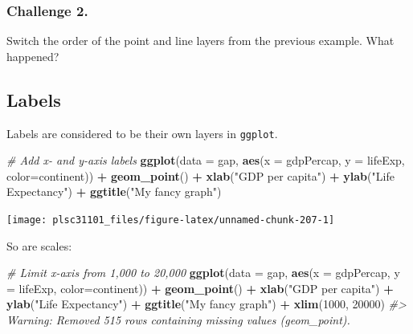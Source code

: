 \documentclass[
]{book}
\newenvironment{Shaded}{\begin{snugshade}}{\end{snugshade}}
\newcommand{\CommentTok}[1]{\textcolor[rgb]{0.56,0.35,0.01}{\textit{#1}}}
\newcommand{\DataTypeTok}[1]{\textcolor[rgb]{0.13,0.29,0.53}{#1}}
\newcommand{\DecValTok}[1]{\textcolor[rgb]{0.00,0.00,0.81}{#1}}
\newcommand{\KeywordTok}[1]{\textcolor[rgb]{0.13,0.29,0.53}{\textbf{#1}}}
\newcommand{\NormalTok}[1]{#1}
\newcommand{\OperatorTok}[1]{\textcolor[rgb]{0.81,0.36,0.00}{\textbf{#1}}}
\newcommand{\StringTok}[1]{\textcolor[rgb]{0.31,0.60,0.02}{#1}}
\begin{document}
\hypertarget{challenge-2.-5}{%
\subsubsection*{Challenge 2.}\label{challenge-2.-5}}

Switch the order of the point and line layers from the previous example. What happened?

\hypertarget{labels-1}{%
\subsection{Labels}\label{labels-1}}

Labels are considered to be their own layers in \texttt{ggplot}.

\begin{Shaded}
\begin{Highlighting}[]
\CommentTok{# Add x- and y-axis labels}
\KeywordTok{ggplot}\NormalTok{(}\DataTypeTok{data =}\NormalTok{ gap, }\KeywordTok{aes}\NormalTok{(}\DataTypeTok{x =}\NormalTok{ gdpPercap, }\DataTypeTok{y =}\NormalTok{ lifeExp, }\DataTypeTok{color=}\NormalTok{continent)) }\OperatorTok{+}\StringTok{ }
\StringTok{  }\KeywordTok{geom_point}\NormalTok{() }\OperatorTok{+}\StringTok{ }
\StringTok{  }\KeywordTok{xlab}\NormalTok{(}\StringTok{"GDP per capita"}\NormalTok{) }\OperatorTok{+}\StringTok{ }
\StringTok{  }\KeywordTok{ylab}\NormalTok{(}\StringTok{"Life Expectancy"}\NormalTok{) }\OperatorTok{+}\StringTok{ }
\StringTok{  }\KeywordTok{ggtitle}\NormalTok{(}\StringTok{"My fancy graph"}\NormalTok{)}
\end{Highlighting}
\end{Shaded}

\begin{center}\texttt{[image: plsc31101\_files/figure-latex/unnamed-chunk-207-1]} \end{center}

So are scales:

\begin{Shaded}
\begin{Highlighting}[]
\CommentTok{# Limit x-axis from 1,000 to 20,000}
\KeywordTok{ggplot}\NormalTok{(}\DataTypeTok{data =}\NormalTok{ gap, }\KeywordTok{aes}\NormalTok{(}\DataTypeTok{x =}\NormalTok{ gdpPercap, }\DataTypeTok{y =}\NormalTok{ lifeExp, }\DataTypeTok{color=}\NormalTok{continent)) }\OperatorTok{+}\StringTok{ }
\StringTok{  }\KeywordTok{geom_point}\NormalTok{() }\OperatorTok{+}\StringTok{ }
\StringTok{  }\KeywordTok{xlab}\NormalTok{(}\StringTok{"GDP per capita"}\NormalTok{) }\OperatorTok{+}\StringTok{ }
\StringTok{  }\KeywordTok{ylab}\NormalTok{(}\StringTok{"Life Expectancy"}\NormalTok{) }\OperatorTok{+}\StringTok{ }
\StringTok{  }\KeywordTok{ggtitle}\NormalTok{(}\StringTok{"My fancy graph"}\NormalTok{) }\OperatorTok{+}\StringTok{ }
\StringTok{  }\KeywordTok{xlim}\NormalTok{(}\DecValTok{1000}\NormalTok{, }\DecValTok{20000}\NormalTok{)}
\CommentTok{#> Warning: Removed 515 rows containing missing values (geom_point).}
\end{Highlighting}
\end{Shaded}
\end{document}
